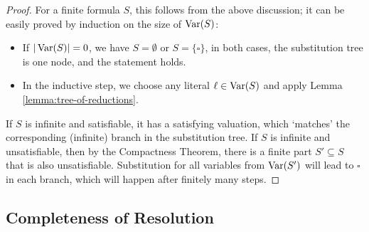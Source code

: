 \begin{proof}
    For a finite formula $S$, this follows from the above discussion; it can be easily proved by induction on the size of $\operatorname{Var}(S)$: 
    \begin{itemize}
        \item If $|\operatorname{Var}(S)| = 0$, we have $S = \emptyset$ or $S = \{\square\}$, in both cases, the substitution tree is one node, and the statement holds. 
        \item In the inductive step, we choose any literal $\ell \in \operatorname{Var}(S)$ and apply Lemma \ref{lemma:tree-of-reductions}.
    \end{itemize} 
If $S$ is infinite and satisfiable, it has a satisfying valuation, which `matches' the corresponding (infinite) branch in the substitution tree. If $S$ is infinite and unsatisfiable, then by the Compactness Theorem, there is a finite part $S' \subseteq S$ that is also unsatisfiable. Substitution for all variables from $\operatorname{Var}(S')$ will lead to $\square$ in each branch, which will happen after finitely many steps.
\end{proof}

\subsection{Completeness of Resolution}

